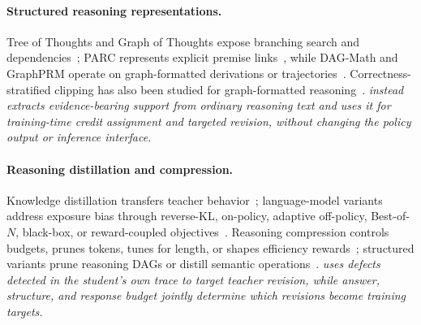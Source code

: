 \paragraph{Structured reasoning representations.}
Tree of Thoughts and Graph of Thoughts expose branching search and dependencies~\citep{yao2023tree,besta2024graph}; PARC represents explicit premise links~\citep{mukherjee2025parc}, while DAG-Math and GraphPRM operate on graph-formatted derivations or trajectories~\citep{zhang2026dagmath,peng2025graphprm}. Correctness-stratified clipping has also been studied for graph-formatted reasoning~\citep{liu2026graph}. \textit{\method instead extracts evidence-bearing support from ordinary reasoning text and uses it for training-time credit assignment and targeted revision, without changing the policy output or inference interface.}

\paragraph{Reasoning distillation and compression.}
Knowledge distillation transfers teacher behavior~\citep{hinton2015distilling}; language-model variants address exposure bias through reverse-KL, on-policy, adaptive off-policy, Best-of-$N$, black-box, or reward-coupled objectives~\citep{minillm2023,agarwal2024gkd,ko2024distillm,sessa2024bond,xu2025kdrl,ye2025gad,yang2026exopd}. Reasoning compression controls budgets, prunes tokens, tunes for length, or shapes efficiency rewards~\citep{snell2024com,muennighoff2025s1,xia2025tokenskip,luo2025o1,arora2026training,aggarwal2025l1}; structured variants prune reasoning DAGs or distill semantic operations~\citep{yuan2026graphpruning,wen2026scaffolding}. \textit{\method uses defects detected in the student's own trace to target teacher revision, while answer, structure, and response budget jointly determine which revisions become training targets.}